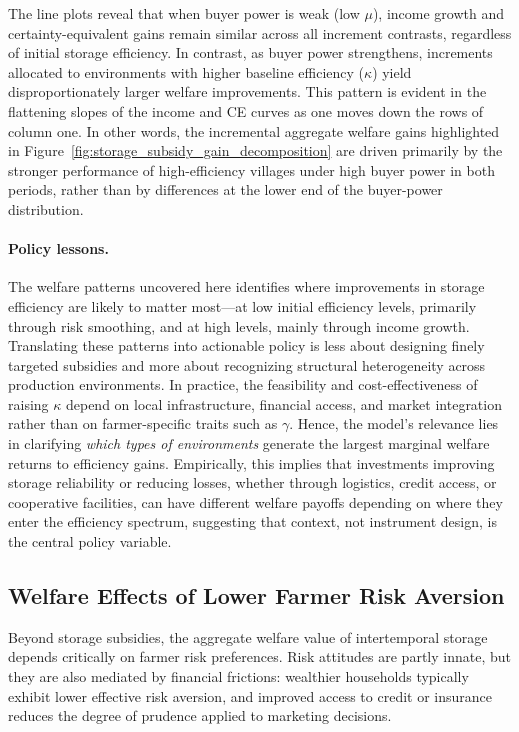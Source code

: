 The line plots reveal that when buyer power is weak (low $\mu$), income growth and certainty-equivalent gains remain similar across all increment contrasts, regardless of initial storage efficiency. In contrast, as buyer power strengthens, increments allocated to environments with higher baseline efficiency ($\kappa$) yield disproportionately larger welfare improvements. This pattern is evident in the flattening slopes of the income and CE curves as one moves down the rows of column one. In other words, the incremental aggregate welfare gains highlighted in Figure~\ref{fig:storage_subsidy_gain_decomposition} are driven primarily by the stronger performance of high-efficiency villages under high buyer power in both periods, rather than by differences at the lower end of the buyer-power distribution.


\paragraph{Policy lessons.}
The welfare patterns uncovered here identifies where improvements in storage efficiency are likely to matter most---at low initial efficiency levels, primarily through risk smoothing, and at high levels, mainly through income growth. Translating these patterns into actionable policy is less about designing finely targeted subsidies and more about recognizing structural heterogeneity across production environments. In practice, the feasibility and cost-effectiveness of raising $\kappa$ depend on local infrastructure, financial access, and market integration rather than on farmer-specific traits such as $\gamma$. Hence, the model's relevance lies in clarifying \emph{which types of environments} generate the largest marginal welfare returns to efficiency gains. Empirically, this implies that investments improving storage reliability or reducing losses, whether through logistics, credit access, or cooperative facilities, can have different welfare payoffs depending on where they enter the efficiency spectrum, suggesting that context, not instrument design, is the central policy variable.


\subsection{Welfare Effects of Lower Farmer Risk Aversion}
\noindent Beyond storage subsidies, the aggregate welfare value of intertemporal storage depends critically on farmer risk preferences. Risk attitudes are partly innate, but they are also mediated by financial frictions: wealthier households typically exhibit lower effective risk aversion, and improved access to credit or insurance reduces the degree of prudence applied to marketing decisions.

